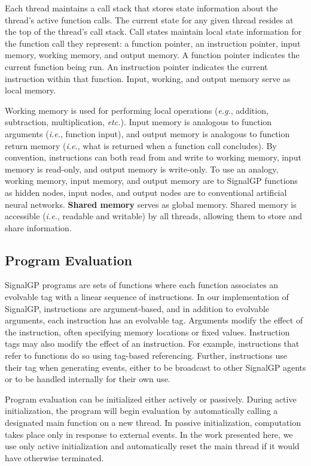 Each thread maintains a call stack that stores state information about the thread's active function calls. 
The current state for any given thread resides at the top of the thread's call stack. 
Call states maintain local state information for the function call they represent: a function pointer, an instruction pointer, input memory, working memory, and output memory. 
A function pointer indicates the current function being run. 
An instruction pointer indicates the current instruction within that function. 
Input, working, and output memory serve as local memory. 

Working memory is used for performing local operations (\textit{e.g.}, addition, subtraction, multiplication, \textit{etc.}). 
Input memory is analogous to function arguments (\textit{i.e.}, function input), and output memory is analogous to function return memory (\textit{i.e.}, what is returned when a function call concludes). 
By convention, instructions can both read from and write to working memory, input memory is read-only, and output memory is write-only. 
To use an analogy, working memory, input memory, and output memory are to SignalGP functions as hidden nodes, input nodes, and output nodes are to conventional artificial neural networks.  
\textbf{Shared memory} serves as global memory. 
Shared memory is accessible (\textit{i.e.}, readable and writable) by all threads, allowing them to store and share information. 

\subsection{Program Evaluation}

SignalGP programs are sets of functions where each function associates an evolvable tag with a linear sequence of instructions. 
In our implementation of SignalGP, instructions are argument-based, and in addition to evolvable arguments, each instruction has an evolvable tag. 
Arguments modify the effect of the instruction, often specifying memory locations or fixed values. 
Instruction tags may also modify the effect of an instruction. For example, instructions that refer to functions do so using tag-based referencing. 
Further, instructions use their tag when generating events, either to be broadcast to other SignalGP agents or to be handled internally for their own use. 

Program evaluation can be initialized either actively or passively.  
During active initialization, the program will begin evaluation by automatically calling a designated main function on a new thread.  
In passive initialization, computation takes place only in response to external events.  
In the work presented here, we use only active initialization and automatically reset the main thread if it would have otherwise terminated.

